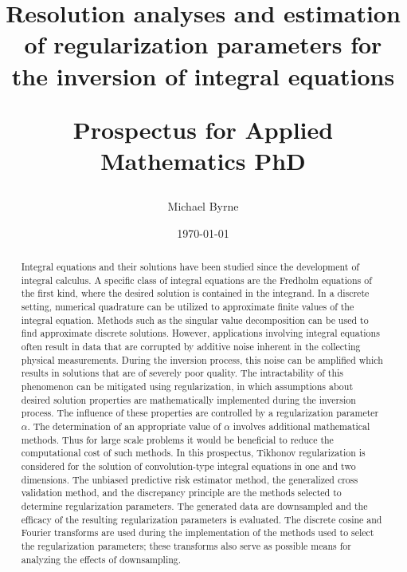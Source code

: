 \documentclass[12pt,notitlepage]{report}
\title{Resolution analyses and estimation of regularization parameters for the inversion of integral equations \\
\begin{large}
Prospectus for Applied Mathematics PhD
\end{large}}
\author{Michael Byrne}
\date{\today}
\newcommand{\regparam}{\alpha}
\begin{document}
\maketitle

\begin{abstract}
Integral equations and their solutions have been studied since the development of integral calculus. A specific class of integral equations are the Fredholm equations of the first kind, where the desired solution is contained in the integrand. In a discrete setting, numerical quadrature can be utilized to approximate finite values of the integral equation. Methods such as the singular value decomposition can be used to find approximate discrete solutions. However, applications involving integral equations often result in data that are corrupted by additive noise inherent in the collecting physical measurements. During the inversion process, this noise can be amplified which results in solutions that are of severely poor quality. The intractability of this phenomenon can be mitigated using regularization, in which assumptions about desired solution properties are mathematically implemented during the inversion process. The influence of these properties are controlled by a regularization parameter $\regparam$. The determination of an appropriate value of $\regparam$ involves additional mathematical methods. Thus for large scale problems it would be beneficial to reduce the computational cost of such methods. In this prospectus, Tikhonov regularization is considered for the solution of convolution-type integral equations in one and two dimensions. The unbiased predictive risk estimator method, the generalized cross validation method, and the discrepancy principle are the methods selected to determine regularization parameters. The generated data are downsampled and the efficacy of the resulting regularization parameters is evaluated. The discrete cosine and Fourier transforms are used during the implementation of the methods used to select the regularization parameters; these transforms also serve as possible means for analyzing the effects of downsampling.
\end{abstract} 

\tableofcontents
\end{document}
